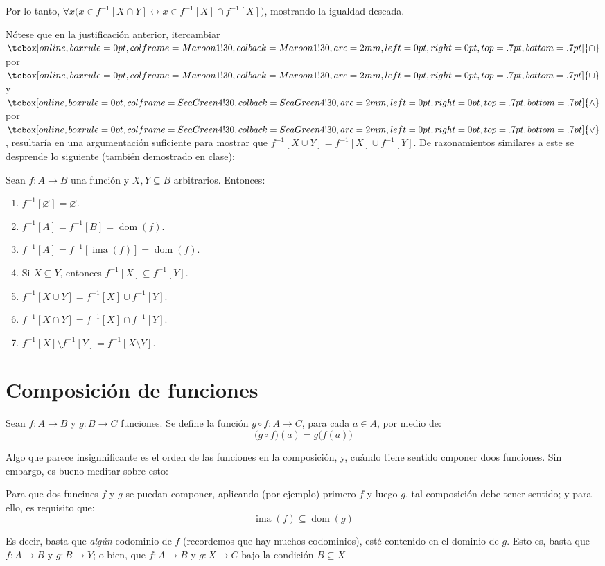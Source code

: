 \documentclass[letterpaper,DIV=14,headsepline,12pt]{scrartcl}
\renewcommand{\emptyset}{\varnothing}
\DeclareMathOperator{\ima}{ima}
\DeclareMathOperator{\dom}{dom}
\newcommand{\marker}[2][Gold2]{
        \ifmmode
        \tcbox[on line,boxrule=0pt,colframe=#1!30,colback=#1!30,arc=2mm,left=0pt,right=0pt,top=.7pt,bottom=.7pt]{\ensuremath{#2}}%
        \else
        \tcbox[on line,boxrule=0pt,colframe=#1!30,colback=#1!30,arc=2mm,left=0pt,right=0pt,top=.7pt,bottom=.7pt]{#2}%
        \fi}
\begin{document}
    Por lo tanto, $\forall x \big( x \in f^{-1}[X \cap Y] \leftrightarrow x \in f^{-1}[X] \cap f^{-1}[X] \big)$, mostrando la igualdad deseada.

    Nótese que en la justificación anterior, itercambiar $\marker[Maroon1]{\cap}$ por $\marker[Maroon1]{\cup}$ y $\marker[SeaGreen4]{\land}$ por $\marker[SeaGreen4]{\lor}$, resultaría en una argumentación suficiente para mostrar que $f^{-1}[X \cup Y] = f^{-1}[X] \cup f^{-1}[Y]$. De razonamientos similares a este se desprende lo siguiente (también demostrado en clase):
     \begin{teorema}
        Sean $f:A \to B$ una función y $X, Y \subseteq B$ arbitrarios. Entonces:
        \begin{enumerate}
            \item $f^{-1}[\emptyset]=\emptyset$.
            \item $f^{-1}[A]=f^{-1}[B]=\dom(f)$.
            \item $f^{-1}[A]=f^{-1}[\ima(f)]=\dom(f)$.
            \item Si $X \subseteq Y$, entonces $f^{-1}[X] \subseteq f^{-1}[Y]$.
            \item $f^{-1}[X \cup Y] = f^{-1}[X] \cup f^{-1}[Y]$.
            \item $f^{-1}[X \cap Y] = f^{-1}[X] \cap f^{-1}[Y]$.
            \item $f^{-1}[X] \setminus f^{-1}[Y] = f^{-1}[X \setminus Y]$.
        \end{enumerate}
    \end{teorema}

    \section{Composición de funciones}
    \begin{definicion}
        Sean $f: A \to B$ y $g: B \to C$ funciones. Se define la función $g \circ f:A \to C$, para cada $a \in A$, por medio de:
        \[ \big( g \circ f \big)(a) = g\big( f(a) \big) \]
    \end{definicion}

    Algo que parece insignnificante es el orden de las funciones en la composición, y, cuándo tiene sentido cmponer doos funciones. Sin embargo, es bueno meditar sobre esto:

    \begin{observacion}
        Para que dos funcines $f$ y $g$ se puedan componer, aplicando (por ejemplo) primero $f$ y luego $g$, tal composición debe tener sentido; y para ello, es requisito que:
        \[ \ima(f) \subseteq \dom(g) \]

        Es decir, basta que \textit{algún} codominio de $f$ (recordemos que hay muchos codominios), esté contenido en el dominio de $g$. Esto es, basta que $f:A \to B$ y $g:B \to Y$; o bien, que $f:A \to B$ y $g:X \to C$ bajo la condición $B \subseteq X$
    \end{observacion}
\end{document}
